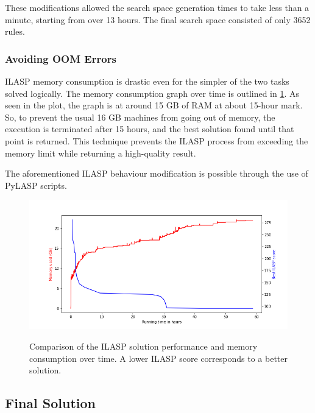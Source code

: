 These modifications allowed the search space generation times to take less than a minute, starting from over 13 hours.
The final search space consisted of only 3652 rules.


\subsubsection{Avoiding OOM Errors}
\label{avoiding-oom-errors}

ILASP memory consumption is drastic even for the simpler of the two tasks solved logically.
The memory consumption graph over time is outlined in \ref{generalisation-memory-graph}.
As seen in the plot, the graph is at around 15 GB of RAM at about 15-hour mark.
So, to prevent the usual 16 GB machines from going out of memory, the execution is terminated after 15 hours, and the best solution found until that point is returned.
This technique prevents the ILASP process from exceeding the memory limit while returning a high-quality result.

The aforementioned ILASP behaviour modification is possible through the use of PyLASP scripts.

\begin{figure}[h]
\caption{Comparison of the ILASP solution performance and memory consumption over time. A lower ILASP score corresponds to a better solution.}
\centering
\includegraphics[width=\textwidth]{solving-nlp-tasks-logically/generalisation_memory_vs_best_score.png}
\label{generalisation-memory-graph}
\end{figure}

\subsection{Final Solution}

